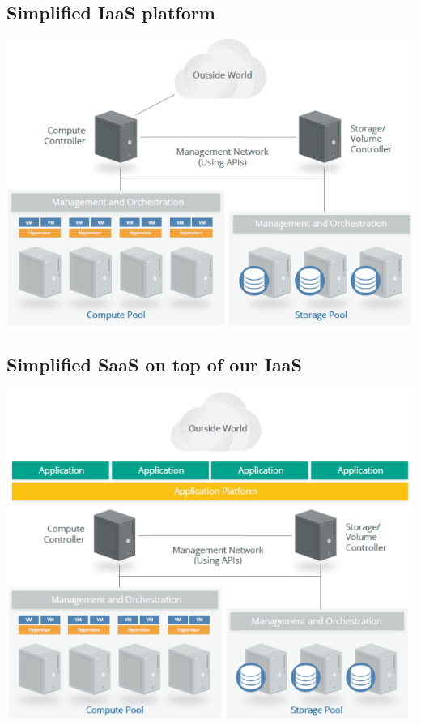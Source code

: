 \documentclass[8pt]{extarticle}
\begin{document}
\begin{multicols}{3}
\subsection{Simplified IaaS platform}
\begin{center}
    \includegraphics[width=\columnwidth]{cloud-simplified-iaas.png}
\end{center}

\subsection{Simplified SaaS on top of our IaaS}
\begin{center}
    \includegraphics[width=\columnwidth]{cloud-simplified-saas.png}
\end{center}



\end{multicols}
\end{document}

